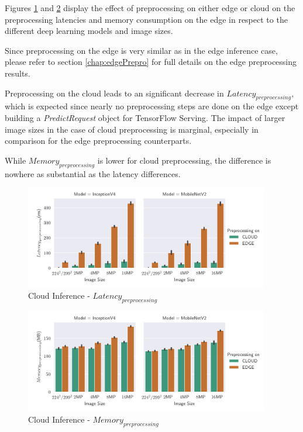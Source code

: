 Figures \ref{fig:cloudInferencePreproLat} and \ref{fig:cloudInferencePreproMemory} display the effect of preprocessing on either edge or cloud on the preprocessing latencies and memory consumption on the edge in respect to the different deep learning models and image sizes.

Since preprocessing on the edge is very similar as in the edge inference case, please refer to section \ref{chap:edgePrepro} for full details on the edge preprocessing results.

Preprocessing on the cloud leads to an significant decrease in $Latency_{preprocessing}$, which is expected since nearly no preprocessing steps are done on the edge except building a \emph{PredictRequest} object for TensorFlow Serving.
The impact of larger image sizes in the case of cloud preprocessing is marginal, especially in comparison for the edge preprocessing counterparts.

While $Memory_{preprocessing}$ is lower for cloud preprocessing, the difference is nowhere as substantial as the latency differences.


\begin{figure}[H]
\centering
\includegraphics[width=0.95\textwidth]{./Bilder/single_plots/cloud_inference_plots/Cloud_Inference_Preprocessing_Latency.pdf}
\caption{Cloud Inference -  $Latency_{preprocessing}$}
\label{fig:cloudInferencePreproLat}
\end{figure}



\begin{figure}[H]
\centering
\includegraphics[width=0.95\textwidth]{./Bilder/single_plots/cloud_inference_plots/Cloud_Inference_Preprocessing_Memory.pdf}
\caption{Cloud Inference -  $Memory_{preprocessing}$}
\label{fig:cloudInferencePreproMemory}
\end{figure}


